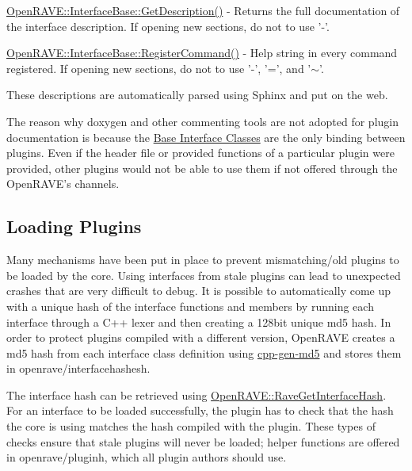 \begin{DoxyItemize}
\item \hyperlink{classOpenRAVE_1_1InterfaceBase_a1b571821be060055bf6f2474e12fa5a3}{OpenRAVE::InterfaceBase::GetDescription()} -\/ Returns the full documentation of the interface description. If opening new sections, do not to use '-\/'.
\end{DoxyItemize}


\begin{DoxyItemize}
\item \hyperlink{classOpenRAVE_1_1InterfaceBase_a840776899a1d3677582fc6ef87be6ef2}{OpenRAVE::InterfaceBase::RegisterCommand()} -\/ Help string in every command registered. If opening new sections, do not to use '-\/', '=', and '$\sim$'.
\end{DoxyItemize}

These descriptions are automatically parsed using Sphinx and put on the web.

The reason why doxygen and other commenting tools are not adopted for plugin documentation is because the \hyperlink{group__interfaces}{Base Interface Classes} are the only binding between plugins. Even if the header file or provided functions of a particular plugin were provided, other plugins would not be able to use them if not offered through the OpenRAVE's channels.\hypertarget{writing__plugins_writing_plugins_loading}{}\subsection{Loading Plugins}\label{writing__plugins_writing_plugins_loading}
Many mechanisms have been put in place to prevent mismatching/old plugins to be loaded by the core. Using interfaces from stale plugins can lead to unexpected crashes that are very difficult to debug. It is possible to automatically come up with a unique hash of the interface functions and members by running each interface through a C++ lexer and then creating a 128bit unique md5 hash. In order to protect plugins compiled with a different version, OpenRAVE creates a md5 hash from each interface class definition using \hyperlink{cpp-gen-md5_8cpp_cpp-gen-md5}{cpp-\/gen-\/md5} and stores them in openrave/interfacehashesh.

The interface hash can be retrieved using \hyperlink{namespaceOpenRAVE_a58037fbef85e1f0c8695edd7e2537172}{OpenRAVE::RaveGetInterfaceHash}. For an interface to be loaded successfully, the plugin has to check that the hash the core is using matches the hash compiled with the plugin. These types of checks ensure that stale plugins will never be loaded; helper functions are offered in openrave/pluginh, which all plugin authors should use. 